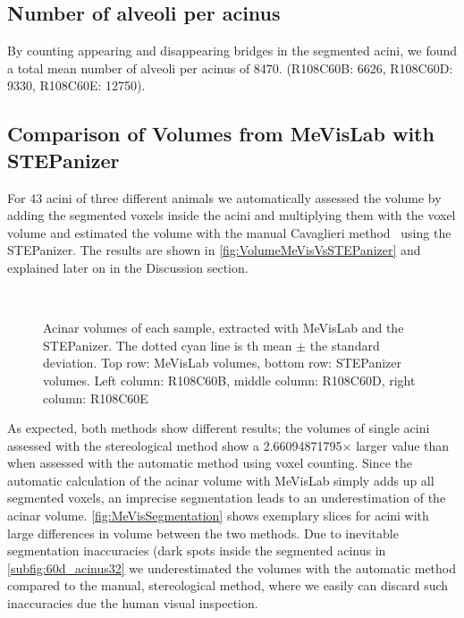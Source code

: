 \documentclass[paper=a4,abstract=true,english,DIV=calc]{scrartcl}
\newcommand{\numberofacini}{43}
\newcommand{\meannumberofalveoli}{8470} %
\newcommand{\difference}{2.66094871795} %
\begin{document}
\subsection{Number of alveoli per acinus}
By counting appearing and disappearing bridges in the segmented acini, we found a total mean number of alveoli per acinus of \meannumberofalveoli. (R108C60B: 6626, R108C60D: 9330, R108C60E: 12750).

\subsection{Comparison of Volumes from MeVisLab with STEPanizer}
For \numberofacini\xspace acini of three different animals we automatically assessed the volume by adding the segmented voxels inside the acini and multiplying them with the voxel volume and estimated the volume with the manual Cavaglieri method~\cite{Hsia2010} using the STEPanizer.
The results are shown in \autoref{fig:VolumeMeVisVsSTEPanizer} and explained later on in the Discussion section.

\begin{figure}
	\centering
	\subfloat[MeVis]{
		}
	\subfloat[MeVis]{
		
		}
	\subfloat[MeVis]{
		
		}\\
	\subfloat[STEPanizer]{
		
		}
	\subfloat[STEPanizer]{
		
		}
	\subfloat[STEPanizer]{
		
		}
	\caption{Acinar volumes of each sample, extracted with MeVisLab and the STEPanizer. The dotted cyan line is th mean \(\pm\) the standard deviation. Top row: MeVisLab volumes, bottom row: STEPanizer volumes. Left column: R108C60B, middle column: R108C60D, right column: R108C60E}
	\label{fig:plots}
\end{figure}

As expected, both methods show different results; the volumes of single acini assessed with the stereological method show a \difference\(\times\) larger value than when assessed with the automatic method using voxel counting.
Since the automatic calculation of the acinar volume with MeVisLab simply adds up all segmented voxels, an imprecise segmentation leads to an underestimation of the acinar volume.
\autoref{fig:MeVisSegmentation} shows exemplary slices for acini with large differences in volume between the two methods.
Due to inevitable segmentation inaccuracies (dark spots inside the segmented acinus in \autoref{subfig:60d_acinus32} we underestimated the volumes with the automatic method compared to the manual, stereological method, where we easily can discard such inaccuracies due the human visual inspection.
\end{document}
